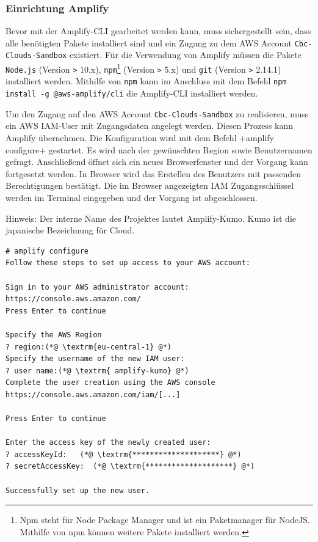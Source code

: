 \subsubsection{Einrichtung Amplify}
\label{EinrichtungAmplify}
Bevor mit der Amplify-CLI gearbeitet werden kann, muss sichergestellt sein, dass alle benötigten Pakete installiert sind und ein Zugang zu dem AWS Account \verb+Cbc-Clouds-Sandbox+ existiert.
Für die Verwendung von Amplify müssen die Pakete \verb+Node.js+ (Version \verb+>+ 10.x), \verb+npm+\footnote{Npm steht für Node Package Manager und ist ein Paketmanager für NodeJS. Mithilfe von npm können weitere Pakete installiert werden.} (Version \verb+>+ 5.x) und \verb+git+ (Version \verb+>+ 2.14.1) installiert werden.
Mithilfe von \verb+npm+ kann im Anschluss mit dem Befehl \verb+npm install -g @aws-amplify/cli+ die Amplify-CLI installiert werden.

Um den Zugang auf den AWS Account \verb+Cbc-Clouds-Sandbox+ zu realisieren, muss ein AWS IAM-User mit Zugangsdaten angelegt werden.
Diesen Prozess kann Amplify übernehmen.
Die Konfiguration wird mit dem Befehl \spverb+amplify configure+ gestartet.
Es wird nach der gewünschten Region sowie Benutzernamen gefragt.
Anschließend öffnet sich ein neues Browserfenster und der Vorgang kann fortgesetzt werden.
In Browser wird das Erstellen des Benutzers mit passenden Berechtigungen bestätigt.
Die im Browser angezeigten IAM Zugangsschlüssel werden im Terminal eingegeben und der Vorgang ist abgeschlossen.\cite{ImpVoraus}
\newline


Hinweis: Der interne Name des Projektes lautet Amplify-Kumo.
Kumo ist die japanische Bezeichnung für \glqq Cloud\grqq.
\clearpage

\begin{lstlisting}[basicstyle=\ttfamily\small, breaklines=true , frame = single, backgroundcolor=\color{flashwhite} ]
# amplify configure
Follow these steps to set up access to your AWS account:

Sign in to your AWS administrator account:
https://console.aws.amazon.com/
Press Enter to continue

Specify the AWS Region
? region:(*@ \textrm{eu-central-1} @*)
Specify the username of the new IAM user:
? user name:(*@ \textrm{ amplify-kumo} @*)
Complete the user creation using the AWS console
https://console.aws.amazon.com/iam/[...]

Press Enter to continue

Enter the access key of the newly created user:
? accessKeyId:   (*@ \textrm{********************} @*)
? secretAccessKey:  (*@ \textrm{********************} @*)

Successfully set up the new user.
\end{lstlisting}



